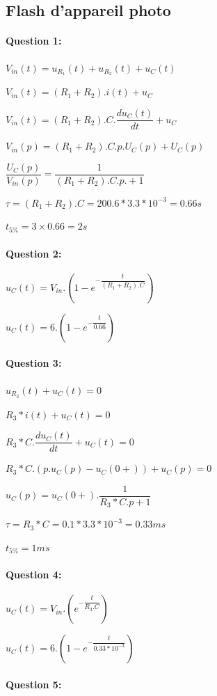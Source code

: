 \subsection{Flash d'appareil photo}

\paragraph{Question 1:}

$V_{in}(t)=u_{R_1}(t)+u_{R_2}(t)+u_C(t)$

$V_{in}(t)=(R_1+R_2).i(t)+u_C$

$V_{in}(t)=(R_1+R_2).C.\dfrac{du_C(t)}{dt}+u_C$

$V_{in}(p)=(R_1+R_2).C.p.U_C(p)+U_C(p)$

$\dfrac{U_C(p)}{V_{in}(p)}=\dfrac{1}{(R_1+R_2).C.p.+1}$

$\tau=(R_1+R_2).C=200.6*3.3*10^{-3}=0.66s$

$t_{5\%}=3\times 0.66=2s$

\paragraph{Question 2:}

$u_C(t)=V_{in}.\left(1-e^{-\dfrac{t}{(R_1+R_2).C}}\right)$

$u_C(t)=6.\left(1-e^{-\dfrac{t}{0.66}}\right)$

\paragraph{Question 3:}

$u_{R_3}(t)+u_C(t)=0$

$R_3*i(t)+u_C(t)=0$

$R_3*C.\dfrac{du_C(t)}{dt}+u_C(t)=0$

$R_3*C.(p.u_C(p)-u_C(0+))+u_C(p)=0$

$u_C(p)=u_C(0+).\dfrac{1}{R_3*C.p+1}$

$\tau=R_3*C=0.1*3.3*10^{-3}=0.33ms$

$t_{5\%}=1ms$

\paragraph{Question 4:}

$u_C(t)=V_{in}.\left(e^{-\dfrac{t}{R_3.C}}\right)$

$u_C(t)=6.\left(1-e^{-\dfrac{t}{0.33*10^{-3}}}\right)$

\paragraph{Question 5:}

